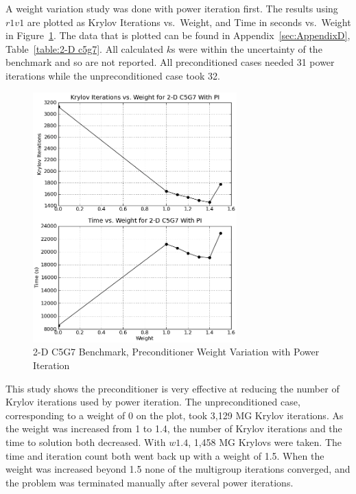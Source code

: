 A weight variation study was done with power iteration first. The results using $r1v1$ are plotted as Krylov Iterations vs.\ Weight, and Time in seconds vs.\ Weight in Figure~\ref{fig:2-Dc5g7PI}. The data that is plotted can be found in Appendix~\ref{sec:AppendixD}, Table~\ref{table:2-D c5g7}. All calculated $k$s were within the uncertainty of the benchmark and so are not reported. All preconditioned cases needed 31 power iterations while the unpreconditioned case took 32.
%
\begin{figure}[!ht]
    \begin{center}
      \includegraphics [width=0.7\textwidth, height=0.7\textheight] {2Dc5g7PI}
   \end{center}
   \caption{2-D C5G7 Benchmark, Preconditioner Weight Variation with Power Iteration}
   \label{fig:2-Dc5g7PI}
\end{figure}

This study shows the preconditioner is very effective at reducing the number of Krylov iterations used by power iteration. The unpreconditioned case, corresponding to a weight of 0 on the plot, took 3,129 MG Krylov iterations. As the weight was increased from 1 to 1.4, the number of Krylov iterations and the time to solution both decreased. With $w1.4$, 1,458 MG Krylovs were taken. The time and iteration count both went back up with a weight of 1.5. When the weight was increased beyond 1.5 none of the multigroup iterations converged, and the problem was terminated manually after several power iterations. 

